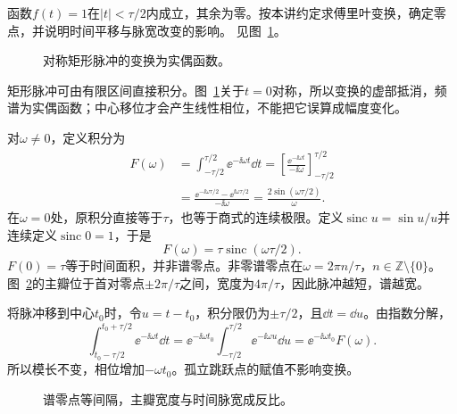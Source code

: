 \begin{exercise}[矩形脉冲的连续傅里叶谱]\label{ex:c4-h8}
函数$f(t)=1$在$|t|<\tau/2$内成立，其余为零。按本讲约定求傅里叶变换，确定零点，并说明时间平移与脉宽改变的影响。 见图~\ref{fig:c4-h8-q}。
\end{exercise}

\begin{figure}[H]\centering
{}
\caption{对称矩形脉冲的变换为实偶函数。}\label{fig:c4-h8-q}
\end{figure}
\begin{solution}
矩形脉冲可由有限区间直接积分。图~\ref{fig:c4-h8-q}关于$t=0$对称，所以变换的虚部抵消，频谱为实偶函数；中心移位才会产生线性相位，不能把它误算成幅度变化。


对$\omega\ne0$，定义积分为
\[\begin{aligned}
F(\omega)&=\int_{-\tau/2}^{\tau/2}\ee^{-\ii\omega t}\dd t
=\left[\frac{\ee^{-\ii\omega t}}{-\ii\omega}\right]_{-\tau/2}^{\tau/2}\\
&=\frac{\ee^{-\ii\omega\tau/2}-\ee^{\ii\omega\tau/2}}{-\ii\omega}
=\frac{2\sin(\omega\tau/2)}{\omega}.
\end{aligned}\]
在$\omega=0$处，原积分直接等于$\tau$，也等于商式的连续极限。定义$\operatorname{sinc}u=\sin u/u$并连续定义$\operatorname{sinc}0=1$，于是
\[\boxed{F(\omega)=\tau\operatorname{sinc}(\omega\tau/2)}.
\]
$F(0)=\tau$等于时间面积，并非谱零点。非零谱零点在$\omega=2\pi n/\tau$，$n\in\mathbb Z\setminus\{0\}$。图~\ref{fig:c4-h8-s}的主瓣位于首对零点$\pm2\pi/\tau$之间，宽度为$4\pi/\tau$，因此脉冲越短，谱越宽。

将脉冲移到中心$t_0$时，令$u=t-t_0$，积分限仍为$\pm\tau/2$，且$\dd t=\dd u$。由指数分解，
\[\int_{t_0-\tau/2}^{t_0+\tau/2}\ee^{-\ii\omega t}\dd t
=\ee^{-\ii\omega t_0}\int_{-\tau/2}^{\tau/2}\ee^{-\ii\omega u}\dd u
=\ee^{-\ii\omega t_0}F(\omega).\]
所以模长不变，相位增加$-\omega t_0$。孤立跳跃点的赋值不影响变换。

\begin{figure}[H]\centering
{}
\caption{谱零点等间隔，主瓣宽度与时间脉宽成反比。}\label{fig:c4-h8-s}
\end{figure}
\end{solution}

